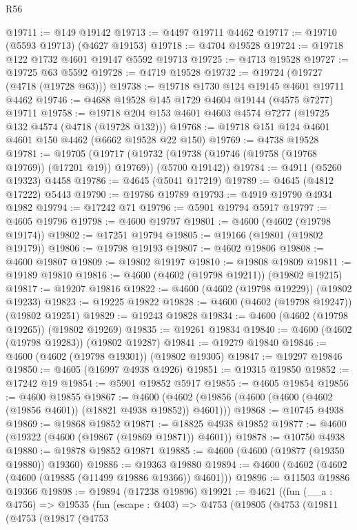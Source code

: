 \begin{lexlean}{R56}
\begin{coremodule}
@19711 := @149 @19142
@19713 := @4497 @19711 @4462
@19717 := @19710 (@5593 @19713) (@4627 @19153)
@19718 := @4704 @19528
@19724 := @19718 @122 @1732 @4601 @19147 @5592 @19713
@19725 := @4713 @19528
@19727 := @19725 @63 @5592
@19728 := @4719 @19528
@19732 := @19724 (@19727 (@4718 (@19728 @63)))
@19738 := @19718 @1730 @124 @19145 @4601 @19711 @4462
@19746 := @4688 @19528 @145 @1729 @4604 @19144 (@4575 @7277) @19711
@19758 := @19718 @204 @153 @4601 @4603 @4574 @7277 (@19725 @132 @4574 (@4718 (@19728 @132)))
@19768 := @19718 @151 @124 @4601 @4601 @150 @4462 (@6662 @19528 @22 @150)
@19769 := @4738 @19528
@19781 := @19705
    (@19717 (@19732 (@19738 (@19746 (@19758 (@19768 @19769)) (@17201 @19)) @19769)) (@5700 @19142))
@19784 := @4911 (@5260 @19323) @4458
@19786 := @4645 (@5041 @17219)
@19789 := @4645 (@4812 @17222) @5443
@19790 := @19786 @19789
@19793 := @4919 @19790 @4934 @1982
@19794 := @17242 @71
@19796 := @5901 @19794 @5917
@19797 := @4605 @19796
@19798 := @4600 @19797
@19801 := @4600 (@4602 (@19798 @19174))
@19802 := @17251 @19794
@19805 := @19166 (@19801 (@19802 @19179))
@19806 := @19798 @19193
@19807 := @4602 @19806
@19808 := @4600 @19807
@19809 := @19802 @19197
@19810 := @19808 @19809
@19811 := @19189 @19810
@19816 := @4600 (@4602 (@19798 @19211)) (@19802 @19215)
@19817 := @19207 @19816
@19822 := @4600 (@4602 (@19798 @19229)) (@19802 @19233)
@19823 := @19225 @19822
@19828 := @4600 (@4602 (@19798 @19247)) (@19802 @19251)
@19829 := @19243 @19828
@19834 := @4600 (@4602 (@19798 @19265)) (@19802 @19269)
@19835 := @19261 @19834
@19840 := @4600 (@4602 (@19798 @19283)) (@19802 @19287)
@19841 := @19279 @19840
@19846 := @4600 (@4602 (@19798 @19301)) (@19802 @19305)
@19847 := @19297 @19846
@19850 := @4605 (@16997 @4938 @4926)
@19851 := @19315 @19850
@19852 := @17242 @19
@19854 := @5901 @19852 @5917
@19855 := @4605 @19854
@19856 := @4600 @19855
@19867 := @4600 (@4602 (@19856 (@4600 (@4600 (@4602 (@19856 @4601)) (@18821 @4938 @19852)) @4601)))
@19868 := @10745 @4938
@19869 := @19868 @19852
@19871 := @18825 @4938 @19852
@19877 := @4600 (@19322 (@4600 (@19867 (@19869 @19871)) @4601))
@19878 := @10750 @4938
@19880 := @19878 @19852 @19871
@19885 := @4600 (@4600 (@19877 (@19350 @19880)) @19360)
@19886 := @19363 @19880
@19894 := @4600 (@4602 (@4602 (@4600 (@19885 (@11499 @19886 @19366)) @4601)))
@19896 := @11503 @19886 @19366
@19898 := @19894 (@17238 @19896)
@19921 := @4621
    ((fun (__a : @4756) =>
    @19535
      (fun (escape : @403) =>
      @4753
        (@19805
          (@4753
            (@19811
              (@4753
                (@19817
                  (@4753

\end{coremodule}
\end{lexlean}
